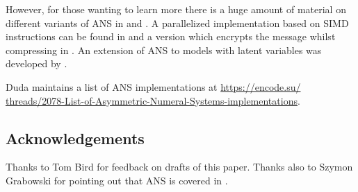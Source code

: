 \documentclass{article}
\theoremstyle{definition}
\begin{document}
However, for those wanting to learn more there is a huge amount of material on
different variants of ANS in \citet{duda2009} and \citet{duda2015}. A
parallelized implementation based on SIMD instructions can be found in
\citet{giesen2014} and a version which encrypts the message whilst compressing
in \citet{duda2016}.  An extension of ANS to models with latent variables was
developed by \citet{townsend2019}.

Duda maintains a list of ANS implementations at
\url{
  https://encode.su/
  threads/2078-List-of-Asymmetric-Numeral-Systems-implementations}.

\subsection*{Acknowledgements}
  Thanks to Tom Bird for feedback on drafts of this paper. Thanks also to
  Szymon Grabowski for pointing out that ANS is covered in \citet{mcanlis2016}.

\printbibliography
\end{document}
